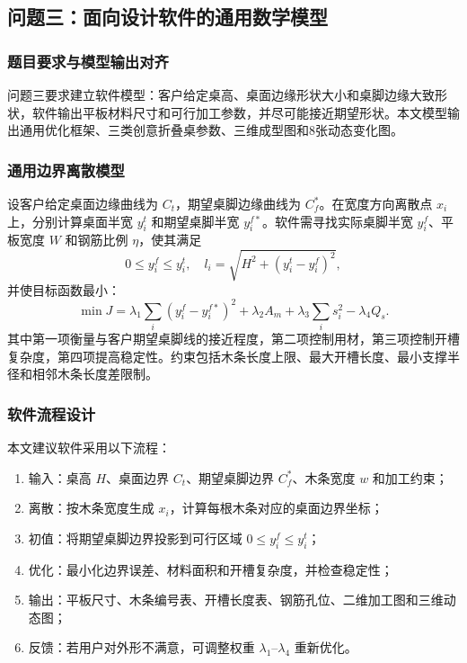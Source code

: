 \documentclass[UTF8,a4paper,12pt]{ctexart}
\begin{document}
\subsection{问题三：面向设计软件的通用数学模型}
\subsubsection{题目要求与模型输出对齐}
问题三要求建立软件模型：客户给定桌高、桌面边缘形状大小和桌脚边缘大致形状，软件输出平板材料尺寸和可行加工参数，并尽可能接近期望形状。本文模型输出通用优化框架、三类创意折叠桌参数、三维成型图和8张动态变化图。

\subsubsection{通用边界离散模型}
设客户给定桌面边缘曲线为 $C_t$，期望桌脚边缘曲线为 $C_f^*$。在宽度方向离散点 $x_i$ 上，分别计算桌面半宽 $y_i^t$ 和期望桌脚半宽 $y_i^{f*}$。软件需寻找实际桌脚半宽 $y_i^f$、平板宽度 $W$ 和钢筋比例 $\eta$，使其满足
\begin{equation}
 0\le y_i^f\le y_i^t,\quad l_i=\sqrt{H^2+(y_i^t-y_i^f)^2},
\end{equation}
并使目标函数最小：
\begin{equation}
 \min J=\lambda_1\sum_i(y_i^f-y_i^{f*})^2+\lambda_2 A_m+\lambda_3\sum_i s_i^2-\lambda_4 Q_s.
\end{equation}
其中第一项衡量与客户期望桌脚线的接近程度，第二项控制用材，第三项控制开槽复杂度，第四项提高稳定性。约束包括木条长度上限、最大开槽长度、最小支撑半径和相邻木条长度差限制。

\subsubsection{软件流程设计}
本文建议软件采用以下流程：
\begin{enumerate}
\item 输入：桌高 $H$、桌面边界 $C_t$、期望桌脚边界 $C_f^*$、木条宽度 $w$ 和加工约束；
\item 离散：按木条宽度生成 $x_i$，计算每根木条对应的桌面边界坐标；
\item 初值：将期望桌脚边界投影到可行区域 $0\le y_i^f\le y_i^t$；
\item 优化：最小化边界误差、材料面积和开槽复杂度，并检查稳定性；
\item 输出：平板尺寸、木条编号表、开槽长度表、钢筋孔位、二维加工图和三维动态图；
\item 反馈：若用户对外形不满意，可调整权重 $\lambda_1$--$\lambda_4$ 重新优化。
\end{enumerate}
\end{document}
